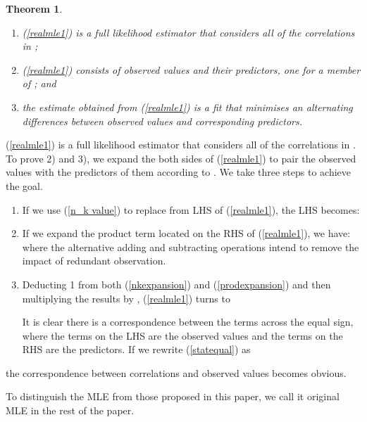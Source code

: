 \documentclass[10pt,onecolumn]{IEEEtran}
\newtheorem{theorem}{\bf Theorem}
\begin{document}
\begin{theorem} \label{minctheorem}

\begin{enumerate}
\item (\ref{realmle1}) is a full likelihood estimator that considers all of the correlations in ;
\item (\ref{realmle1}) consists of  observed values and their predictors, one for a member of ; and
\item the estimate obtained from (\ref{realmle1})  is a fit that minimises an alternating differences between observed values and corresponding predictors.
    \end{enumerate}
\end{theorem}
\begin{IEEEproof}
(\ref{realmle1}) is a full likelihood estimator that considers all of the correlations in . To prove 2) and 3),  we expand the both sides of (\ref{realmle1}) to pair the observed values with the  predictors of them according to . We take three steps to achieve the goal.
\begin{enumerate}
\item  If  we use (\ref{n_k value}) to replace  from LHS of (\ref{realmle1}),  the LHS becomes:

\item If we expand the product term located on  the RHS of (\ref{realmle1}), we have:
 where the alternative adding and subtracting operations intend to remove the impact of redundant observation.
\item Deducting 1 from both (\ref{nkexpansion}) and (\ref{prodexpansion})
and then multiplying the results by , (\ref{realmle1}) turns to

It is clear there is a correspondence between the terms across
the equal sign, where the terms on the LHS are the observed values and the terms on the RHS are the predictors. If we rewrite
(\ref{statequal}) as

\end{enumerate}
the correspondence between correlations and observed values becomes obvious.
\end{IEEEproof}

To distinguish the MLE from those proposed in this paper, we call it original MLE in the rest of the paper.
\end{document}
